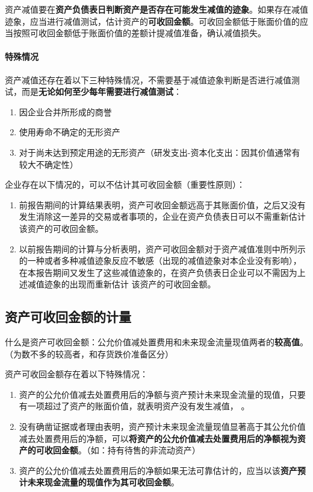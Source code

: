 \documentclass[UTF8,12pt]{ctexart}
\numberwithin{equation}{section} %
\numberwithin{figure}{section}
\numberwithin{table}{section}
\begin{document}
	资产减值要在\textbf{资产负债表日判断资产是否存在可能发生减值的迹象}。如果存在减值迹象，应当进行减值测试，估计资产的\textbf{可收回金额}。可收回金额低于账面价值的应当按照可收回金额低于账面价值的差额计提减值准备，确认减值损失。
	
	\paragraph{特殊情况}资产减值还存在着以下三种特殊情况，不需要基于减值迹象判断是否进行减值测试，而是\textbf{无论如何至少每年需要进行减值测试}：
	\begin{enumerate}
		\item 因企业合并所形成的商誉
		
		\item 使用寿命不确定的无形资产
		
		\item 对于尚未达到预定用途的无形资产（研发支出-资本化支出：因其价值通常有较大不确定性）
	\end{enumerate}
	
	企业存在以下情况的，可以不估计其可收回金额（重要性原则）：
	\begin{enumerate}
		\item 前报告期间的计算结果表明，资产可收回金额远高于其账面价值，之后又没有发生消除这一差异的交易或者事项的，企业在资产负债表日可以不需重新估计该资产的可收回金额。
		\item 以前报告期间的计算与分析表明，资产可收回金额对于资产减值准则中所列示的一种或者多种减值迹象反应不敏感（出现的减值迹象对本企业没有影响），在本报告期间又发生了这些减值迹象的，在资产负债表日企业可以不需因为上述减值迹象的出现而重新估计  该资产的可收回金额。
	\end{enumerate}
	
	\subsection{资产可收回金额的计量}
	什么是资产可收回金额：公允价值减处置费用和未来现金流量现值两者的\textbf{较高值}。（为数不多的较高者，和存货跌价准备区分）
	
	资产可收回金额存在着以下特殊情况：
	\begin{enumerate}
		\item 资产的公允价值减去处置费用后的净额与资产预计未来现金流量的现值，只要有一项超过了资产的账面价值，就表明资产没有发生减值，\textbf{ }。
		\item 没有确凿证据或者理由表明，资产预计未来现金流量现值显著高于其公允价值减去处置费用后的净额，可以\textbf{将资产的公允价值减去处置费用后的净额视为资产的可收回金额}。（如：持有待售的非流动资产）
		\item 资产的公允价值减去处置费用后的净额如果无法可靠估计的，应当以该\textbf{资产预计未来现金流量的现值作为其可收回金额}。
		
	\end{enumerate}
	
\end{document}
